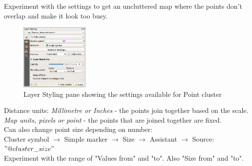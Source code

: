 Experiment with the settings to get an uncluttered map where the points don't overlap and make it look too busy.

\begin{figure}[!h]
	\centering
	\includegraphics[width=0.3\textwidth]{images/point_cluster_layer_styling_panel.png}
	\caption{Layer Styling pane showing the settings available for Point cluster}
	\label{ft_fig_firstfig3}
\end{figure}


Distance units: \textit{Millimetre or Inches} - the points join together based on the scale. \textit{Map units, pixels or point} - the points that are joined together are fixed.\\

Can also change point size depending on number:\\
Cluster symbol $\rightarrow$ Simple marker $\rightarrow$ Size $\rightarrow$ Assistant $\rightarrow$ Source: $"@cluster\_size"$\\

Experiment with the range of "Values from" and "to". Also "Size from" and "to".\\


